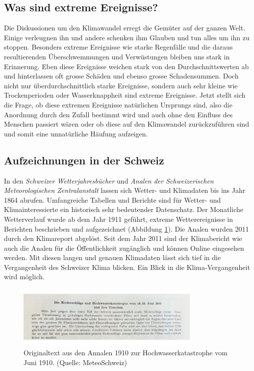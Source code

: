 \begin{refsection}
\section{Was sind extreme Ereignisse?}
Die Diskussionen um den Klimawandel erregt die Gemüter auf der ganzen Welt. Einige verleugnen ihn und andere schenken ihm Glauben und tun alles um ihn zu stoppen. Besonders extreme Ereignisse wie starke Regenfälle und die daraus resultierenden Überschwemmungen und Verwüstungen bleiben uns stark in Erinnerung.
Eben diese Ereignisse weichen stark von den Durchschnittswerten ab und hinterlassen oft grosse Schäden und ebenso grosse Schadensummen. Doch nicht nur überdurchschnittlich starke Ereignisse, sondern auch sehr kleine wie Trockenperioden oder Wasserknappheit sind extreme Ereignisse.
Jetzt stellt sich die Frage, ob diese extremen Ereignisse natürlichen Ursprungs sind, also  die Anordnung durch den Zufall bestimmt wird und auch ohne den Einfluss des Menschen passiert wären oder ob diese auf den Klimawandel zurückzuführen sind und somit eine unnatürliche Häufung aufzeigen.


\subsection{Aufzeichnungen in der Schweiz}
In den \textit{Schweizer Wetterjahresbücher} und \textit{Analen der Schweizerischen Meteorologischen Zentralanstalt} lassen sich Wetter- und Klimadaten bis ins Jahr 1864 abrufen. Umfangreiche Tabellen und Berichte sind für Wetter- und Klimainteressierte ein historisch sehr bedeutender Datenschatz. 
Der Monatliche Wetterverlauf wurde ab dem Jahr 1911 geführt, extreme Wetterereignisse in Berichten beschrieben und aufgezeichnet (Abbildung \ref{Analen}). Die Analen wurden 2011 durch den Klimareport abgelöst. Seit dem Jahr 2011 sind der Klimabericht wie auch die Analen für die Öffentlichkeit zugänglich und können Online eingesehen werden.
Mit diesen langen und genauen Klimadaten lässt sich tief in die Vergangenheit des Schweizer Klima blicken. Ein Blick in die Klima-Vergangenheit wird möglich.

\begin{figure}[htbp]
\centering
\includegraphics[width=0.8\textwidth]{extrem/Analen.jpg}
\caption{Originaltext aus den Annalen 1910 zur Hochwasserkatastrophe vom Juni 1910. (Quelle: MeteoSchweiz)}
\label{Analen}
\end{figure}



\end{refsection}
